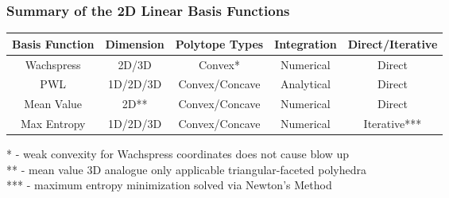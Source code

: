 \documentclass[compress,10pt]{beamer}
\renewcommand{\vec}[1]{\mathbf{#1}}
\begin{document}

\begin{frame}[t]\frametitle{Summary of the 2D Linear Basis Functions}
\centering
\vspace{1cm}
\begin{table}
\footnotesize
\begin{tabular}{|c|c|c|c|c|}
\hline
Basis Function & Dimension & Polytope Types & Integration & Direct/Iterative \\
\hline \hline
Wachspress	&2D/3D&	Convex*&	Numerical	&Direct\\ \hline
PWL&	1D/2D/3D&	Convex/Concave&	Analytical	&Direct\\ \hline
Mean Value&	2D**&	Convex/Concave&	Numerical	&Direct\\ \hline
Max Entropy&	1D/2D/3D	&Convex/Concave&	Numerical&	Iterative***\\ \hline
\end{tabular}
\end{table}
\vspace{0.5cm}
\begin{block}{}
* - weak convexity for Wachspress coordinates does not cause blow up\\
** - mean value 3D analogue only applicable triangular-faceted polyhedra \\
*** - maximum entropy minimization solved via Newton's Method 
\end{block}
\end{frame}
\end{document}
